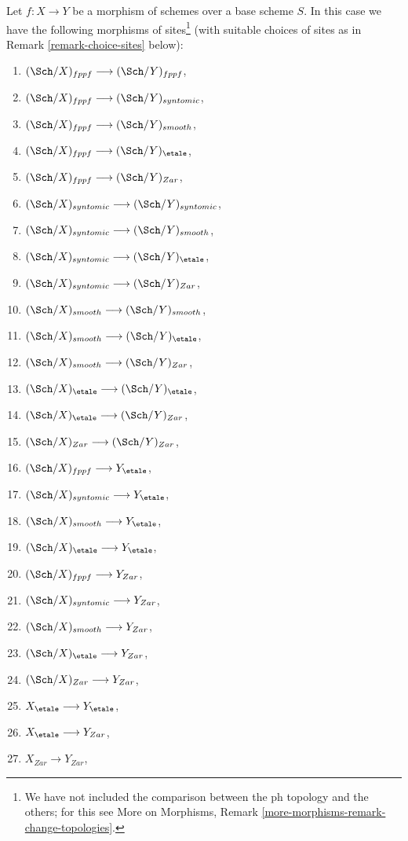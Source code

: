 \noindent
Let $f : X \to Y$ be a morphism of schemes over a base scheme $S$.
In this case we have the following morphisms of sites\footnote{We have
not included the comparison between the ph topology and the others;
for this see
More on Morphisms, Remark \ref{more-morphisms-remark-change-topologies}.}
(with suitable choices of sites as in Remark \ref{remark-choice-sites}
below):
\begin{enumerate}
\item $(\Sch/X)_{fppf} \longrightarrow (\Sch/Y)_{fppf}$,
\item $(\Sch/X)_{fppf} \longrightarrow (\Sch/Y)_{syntomic}$,
\item $(\Sch/X)_{fppf} \longrightarrow (\Sch/Y)_{smooth}$,
\item $(\Sch/X)_{fppf} \longrightarrow
(\Sch/Y)_\etale$,
\item $(\Sch/X)_{fppf} \longrightarrow (\Sch/Y)_{Zar}$,
\item $(\Sch/X)_{syntomic} \longrightarrow (\Sch/Y)_{syntomic}$,
\item $(\Sch/X)_{syntomic} \longrightarrow (\Sch/Y)_{smooth}$,
\item $(\Sch/X)_{syntomic} \longrightarrow
(\Sch/Y)_\etale$,
\item $(\Sch/X)_{syntomic} \longrightarrow (\Sch/Y)_{Zar}$,
\item $(\Sch/X)_{smooth} \longrightarrow (\Sch/Y)_{smooth}$,
\item $(\Sch/X)_{smooth} \longrightarrow
(\Sch/Y)_\etale$,
\item $(\Sch/X)_{smooth} \longrightarrow (\Sch/Y)_{Zar}$,
\item $(\Sch/X)_\etale \longrightarrow
(\Sch/Y)_\etale$,
\item $(\Sch/X)_\etale \longrightarrow (\Sch/Y)_{Zar}$,
\item $(\Sch/X)_{Zar} \longrightarrow (\Sch/Y)_{Zar}$,
\item $(\Sch/X)_{fppf} \longrightarrow Y_\etale$,
\item $(\Sch/X)_{syntomic} \longrightarrow Y_\etale$,
\item $(\Sch/X)_{smooth} \longrightarrow Y_\etale$,
\item $(\Sch/X)_\etale \longrightarrow Y_\etale$,
\item $(\Sch/X)_{fppf} \longrightarrow Y_{Zar}$,
\item $(\Sch/X)_{syntomic} \longrightarrow Y_{Zar}$,
\item $(\Sch/X)_{smooth} \longrightarrow Y_{Zar}$,
\item $(\Sch/X)_\etale \longrightarrow Y_{Zar}$,
\item $(\Sch/X)_{Zar} \longrightarrow Y_{Zar}$,
\item $X_\etale \longrightarrow Y_\etale$,
\item $X_\etale \longrightarrow Y_{Zar}$,
\item $X_{Zar} \longrightarrow Y_{Zar}$,
\end{enumerate}
